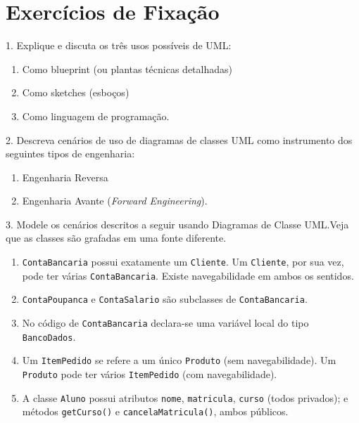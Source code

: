 \documentclass[
  11pt,
  twoside]{book}
\newcommand{\passthrough}[1]{#1}
\providecommand{\tightlist}{%
  \setlength{\itemsep}{0pt}\setlength{\parskip}{0pt}}
\begin{document}
\hypertarget{exercuxedcios-de-fixauxe7uxe3o-3}{%
\section*{Exercícios de
Fixação}\label{exercuxedcios-de-fixauxe7uxe3o-3}}

1. Explique e discuta os três usos possíveis de UML:

\begin{enumerate}
\def\labelenumi{(\alph{enumi})}
\tightlist
\item
  Como blueprint (ou plantas técnicas detalhadas)
\item
  Como sketches (esboços)
\item
  Como linguagem de programação.
\end{enumerate}

2. Descreva cenários de uso de diagramas de classes UML como instrumento
dos seguintes tipos de engenharia:

\begin{enumerate}
\def\labelenumi{(\alph{enumi})}
\tightlist
\item
  Engenharia Reversa
\item
  Engenharia Avante (\emph{Forward Engineering}).
\end{enumerate}

3. Modele os cenários descritos a seguir usando Diagramas de Classe
UML.Veja que as classes são grafadas em uma fonte diferente.

\begin{enumerate}
\def\labelenumi{(\alph{enumi})}
\item
  \passthrough{\lstinline!ContaBancaria!} possui exatamente um
  \passthrough{\lstinline!Cliente!}. Um
  \passthrough{\lstinline!Cliente!}, por sua vez, pode ter várias
  \passthrough{\lstinline!ContaBancaria!}. Existe navegabilidade em
  ambos os sentidos.
\item
  \passthrough{\lstinline!ContaPoupanca!} e
  \passthrough{\lstinline!ContaSalario!} são subclasses de
  \passthrough{\lstinline!ContaBancaria!}.
\item
  No código de \passthrough{\lstinline!ContaBancaria!} declara-se uma
  variável local do tipo \passthrough{\lstinline!BancoDados!}.
\item
  Um \passthrough{\lstinline!ItemPedido!} se refere a um único
  \passthrough{\lstinline!Produto!} (sem navegabilidade). Um
  \passthrough{\lstinline!Produto!} pode ter vários
  \passthrough{\lstinline!ItemPedido!} (com navegabilidade).
\item
  A classe \passthrough{\lstinline!Aluno!} possui atributos
  \passthrough{\lstinline!nome!}, \passthrough{\lstinline!matricula!},
  \passthrough{\lstinline!curso!} (todos privados); e métodos
  \passthrough{\lstinline!getCurso()!} e
  \passthrough{\lstinline!cancelaMatricula()!}, ambos públicos.
\end{enumerate}
\end{document}

